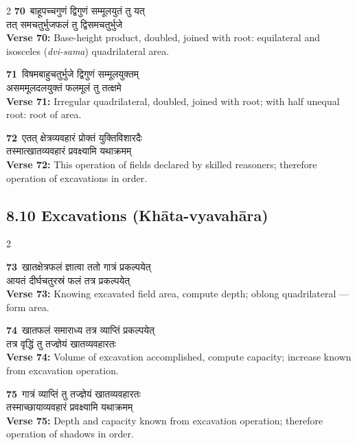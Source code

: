 \documentclass[11pt,a4paper]{article}
\newcommand{\dev}[1]{{\devanagarifont #1}}
\newcommand{\iast}[1]{\textit{#1}}
\newcommand{\vnum}[1]{\textcolor{versenumbercolor}{\textbf{#1}}}
\begin{document}
\begin{paracol}{2}
\switchcolumn[0]
\vnum{70}\ \dev{बाहूपच्चगुणं द्विगुणं सम्मूलयुतं तु यत्}\\
\dev{तत् समचतुर्भुजफलं तु द्विसमचतुर्भुजे}\\
\switchcolumn[1]
\textbf{Verse 70:} Base-height product, doubled, joined with root: equilateral and isosceles (\iast{dvi-sama}) quadrilateral area.

\switchcolumn[0]
\vnum{71}\ \dev{विषमबाहुचतुर्भुजे द्विगुणं सम्मूलयुक्तम्}\\
\dev{असममूलदलयुक्तं फलमूलं तु तत्क्षमे}\\
\switchcolumn[1]
\textbf{Verse 71:} Irregular quadrilateral, doubled, joined with root; with half unequal root: root of area.

\switchcolumn[0]
\vnum{72}\ \dev{एतत् क्षेत्रव्यवहारं प्रोक्तं युक्तिविशारदैः}\\
\dev{तस्मात्खातव्यवहारं प्रवक्ष्यामि यथाक्रमम्}\\
\switchcolumn[1]
\textbf{Verse 72:} This operation of fields declared by skilled reasoners; therefore operation of excavations in order.

\end{paracol}

\subsection*{8.10 Excavations (Kh\=ata-vyavah\=ara)}
\label{sec:8.10}

\begin{paracol}{2}

\switchcolumn[0]
\vnum{73}\ \dev{खातक्षेत्रफलं ज्ञात्वा ततो गात्रं प्रकल्पयेत्}\\
\dev{आयतं दीर्घचतुरस्रं फलं तत्र प्रकल्पयेत्}\\
\switchcolumn[1]
\textbf{Verse 73:} Knowing excavated field area, compute depth; oblong quadrilateral --- form area.

\switchcolumn[0]
\vnum{74}\ \dev{खातफलं समाराध्य तत्र व्याप्तिं प्रकल्पयेत्}\\
\dev{तत्र वृद्धिं तु तज्ज्ञेयं खातव्यवहारतः}\\
\switchcolumn[1]
\textbf{Verse 74:} Volume of excavation accomplished, compute capacity; increase known from excavation operation.

\switchcolumn[0]
\vnum{75}\ \dev{गात्रं व्याप्तिं तु तज्ज्ञेयं खातव्यवहारतः}\\
\dev{तस्माच्छायाव्यवहारं प्रवक्ष्यामि यथाक्रमम्}\\
\switchcolumn[1]
\textbf{Verse 75:} Depth and capacity known from excavation operation; therefore operation of shadows in order.

\end{paracol}
\end{document}
